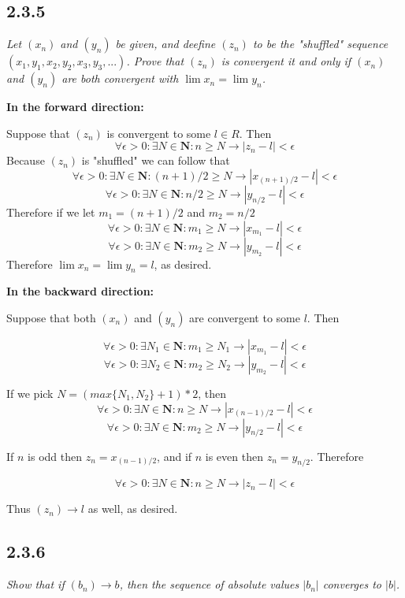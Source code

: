 \documentclass[11pt,oneside,titlepage]{book}
\begin{document}
\subsection*{2.3.5}
\textit{Let $(x_n)$ and $(y_n)$ be given, and deefine $(z_n)$ to be the
  "shuffled" sequence $(x_1, y_1, x_2, y_2, x_3, y_3, ...)$. Prove that
  $(z_n)$ is convergent it and only if $(x_n)$ and $(y_n)$ are both
  convergent with $\lim x_n = \lim y_n $.}

\textbf{In the forward direction:}

Suppose that $(z_n)$ is convergent to some $l \in R$. Then 
$$\forall \epsilon > 0: \exists N \in \textbf{N}: n \geq N \to |z_n - l| < \epsilon$$
Because $(z_n)$ is "shuffled" we can follow that 
$$\forall \epsilon > 0: \exists N \in \textbf{N}: (n + 1) / 2 \geq N \to
|x_{(n + 1) / 2} - l| < \epsilon$$
$$\forall \epsilon > 0: \exists N \in \textbf{N}: n  / 2 \geq N \to |y_{n/2} - l| < \epsilon$$
Therefore if we let $m_1 = (n + 1) / 2$ and $m_2 = n/2$
$$\forall \epsilon > 0: \exists N \in \textbf{N}: m_1 \geq N \to |x_{m_1} - l| < \epsilon$$
$$\forall \epsilon > 0: \exists N \in \textbf{N}: m_2 \geq N \to |y_{m_2} - l| < \epsilon$$
Therefore $\lim x_n = \lim y_n = l$, as desired.

\textbf{In the backward direction:}

Suppose that both $(x_n)$ and $(y_n)$ are convergent to some $l$. Then

$$\forall \epsilon > 0: \exists N_1 \in \textbf{N}: m_1 \geq N_1 \to |x_{m_1} - l| < \epsilon$$
$$\forall \epsilon > 0: \exists N_2 \in \textbf{N}: m_2 \geq N_2 \to |y_{m_2} - l| < \epsilon$$

If we pick $N = (max\{N_1, N_2\} + 1) * 2$, then
$$\forall \epsilon > 0: \exists N \in \textbf{N}: n \geq N \to |x_{(n - 1) / 2 } - l| < \epsilon$$
$$\forall \epsilon > 0: \exists N \in \textbf{N}: m_2 \geq N \to |y_{n/2} - l| < \epsilon$$

If $n$ is odd then  $z_n = x_{(n - 1) / 2}$, and if $n$ is even
then $z_n = y_{n/2}$. Therefore 

$$\forall \epsilon > 0: \exists N \in \textbf{N}: n \geq N \to |z_n - l| < \epsilon$$

Thus $(z_n) \to l$ as well, as desired.

\subsection*{2.3.6}
\textit{Show that if $(b_n) \to b$, then the sequence of absolute values
  $|b_n|$ converges to $|b|$.}
\end{document}
